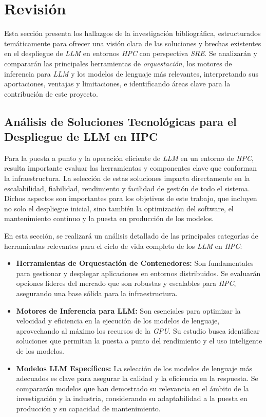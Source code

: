 \section{Revisión}
Esta sección presenta los hallazgos de la investigación bibliográfica, estructurados temáticamente para ofrecer una visión clara de las soluciones y brechas existentes en el despliegue de \textit{LLM} en entornos \textit{HPC} con perspectiva \textit{SRE}. Se analizarán y compararán las principales herramientas de \textit{orquestación}, los motores de inferencia para \textit{LLM} y los modelos de lenguaje más relevantes, interpretando sus aportaciones, ventajas y limitaciones, e identificando áreas clave para la contribución de este proyecto.

\subsection{Análisis de Soluciones Tecnológicas para el Despliegue de LLM en HPC}
Para la puesta a punto y la operación eficiente de \textit{LLM} en un entorno de \textit{HPC}, resulta importante evaluar las herramientas y componentes clave que conforman la infraestructura. La selección de estas soluciones impacta directamente en la escalabilidad, fiabilidad, rendimiento y facilidad de gestión de todo el sistema. Dichos aspectos son importantes para los objetivos de este trabajo, que incluyen no solo el despliegue inicial, sino también la optimización del software, el mantenimiento continuo y la puesta en producción de los modelos.

En esta sección, se realizará un análisis detallado de las principales categorías de herramientas relevantes para el ciclo de vida completo de los \textit{LLM} en \textit{HPC}:
\begin{itemize}
    \item \textbf{Herramientas de Orquestación de Contenedores:} Son fundamentales para gestionar y desplegar aplicaciones en entornos distribuidos. Se evaluarán opciones líderes del mercado que son robustas y escalables para \textit{HPC}, asegurando una base sólida para la infraestructura.
    \item \textbf{Motores de Inferencia para LLM:} Son esenciales para optimizar la velocidad y eficiencia en la ejecución de los modelos de lenguaje, aprovechando al máximo los recursos de la \textit{GPU}. Su estudio busca identificar soluciones que permitan la puesta a punto del rendimiento y el uso inteligente de los modelos.
    \item \textbf{Modelos LLM Específicos:} La selección de los modelos de lenguaje más adecuados es clave para asegurar la calidad y la eficiencia en la respuesta. Se compararán modelos que han demostrado su relevancia en el ámbito de la investigación y la industria, considerando su adaptabilidad a la puesta en producción y su capacidad de mantenimiento.
\end{itemize}


